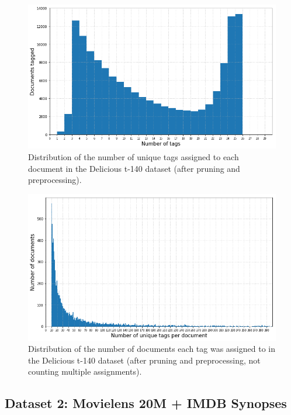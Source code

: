 \begin{figure}[!h]
    \centering
    \includegraphics[width=\textwidth]{chapters/05_experiments/images/delicious_tag_per_resource.png}
    \caption{Distribution of the number of unique tags assigned to each document in the Delicious t-140 dataset (after pruning and preprocessing).}
    \label{fig:delicious_tag_doc_distr}
\end{figure}

\begin{figure}[H]
    \centering
    \includegraphics[width=\textwidth]{chapters/05_experiments/images/delicious_resource_per_tag.png}
    \caption{Distribution of the number of documents each tag was assigned to in the Delicious t-140 dataset (after pruning and preprocessing, not counting multiple assignments).}
    \label{fig:delicious_tag_doc_distr}
\end{figure}

\subsection{Dataset 2: Movielens 20M + IMDB Synopses}\label{subsec:dataset_2}

